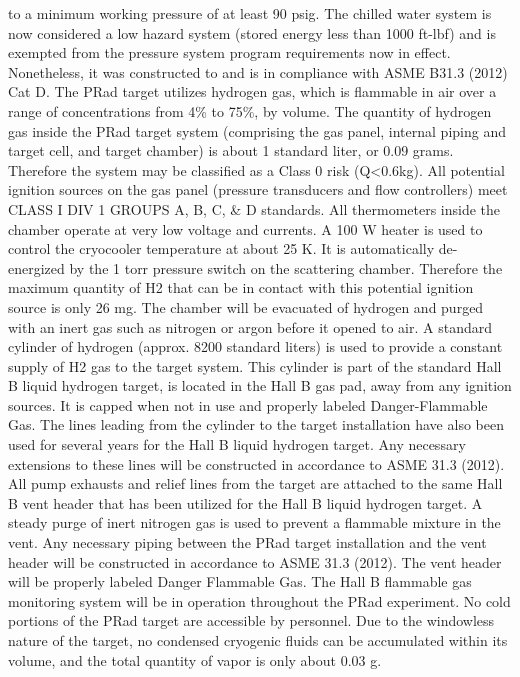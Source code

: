 to a minimum working pressure of at least 90 psig. The chilled water system is now
considered a low hazard system (stored energy less than 1000 ft-lbf) and is exempted from
the pressure system program requirements now in effect. Nonetheless, it was constructed
to and is in compliance with ASME B31.3 (2012) Cat D.
The PRad target utilizes hydrogen gas, which is flammable in air over a range
of concentrations from 4\% to 75\%, by volume. The quantity of hydrogen gas inside
the PRad target system (comprising the gas panel, internal piping and target cell, and
target chamber) is about 1 standard liter, or 0.09 grams. Therefore the system may be
classified as a Class 0 risk (Q<0.6kg). All potential ignition sources on the gas panel
(pressure transducers and flow controllers) meet CLASS I DIV 1 GROUPS A, B, C,
\& D standards. All thermometers inside the chamber operate at very low voltage and
currents. A 100 W heater is used to control the cryocooler temperature at about 25 K.
It is automatically de-energized by the 1 torr pressure switch on the scattering chamber.
Therefore the maximum quantity of H2 that can be in contact with this potential ignition
source is only 26 mg. The chamber will be evacuated of hydrogen and purged with an
inert gas such as nitrogen or argon before it opened to air.
A standard cylinder of hydrogen (approx. 8200 standard liters) is used to provide
a constant supply of H2 gas to the target system. This cylinder is part of the standard
Hall B liquid hydrogen target, is located in the Hall B gas pad, away from any ignition
sources. It is capped when not in use and properly labeled Danger-Flammable Gas. The
lines leading from the cylinder to the target installation have also been used for several
years for the Hall B liquid hydrogen target. Any necessary extensions to these lines will
be constructed in accordance to ASME 31.3 (2012).
All pump exhausts and relief lines from the target are attached to the same Hall B
vent header that has been utilized for the Hall B liquid hydrogen target. A steady purge
of inert nitrogen gas is used to prevent a flammable mixture in the vent. Any necessary
piping between the PRad target installation and the vent header will be constructed
in accordance to ASME 31.3 (2012). The vent header will be properly labeled Danger
Flammable Gas. The Hall B flammable gas monitoring system will be in operation
throughout the PRad experiment.
No cold portions of the PRad target are accessible by personnel. Due to the windowless nature of the target, no condensed cryogenic fluids can be accumulated within
its volume, and the total quantity of vapor is only about 0.03 g.
